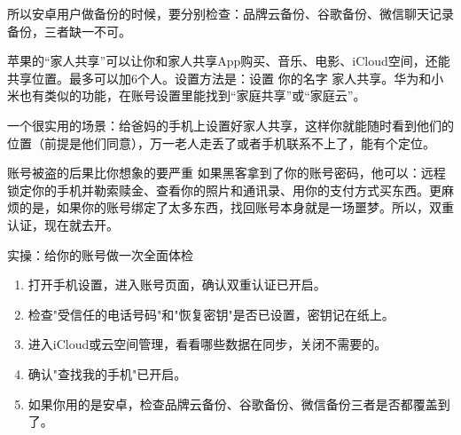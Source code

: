 所以安卓用户做备份的时候，要分别检查：品牌云备份、谷歌备份、微信聊天记录备份，三者缺一不可。


苹果的“家人共享”可以让你和家人共享App购买、音乐、电影、iCloud空间，还能共享位置。最多可以加6个人。设置方法是：设置 你的名字 家人共享。华为和小米也有类似的功能，在账号设置里能找到“家庭共享”或“家庭云”。

一个很实用的场景：给爸妈的手机上设置好家人共享，这样你就能随时看到他们的位置（前提是他们同意），万一老人走丢了或者手机联系不上了，能有个定位。

\begin{tcbwarn}{账号被盗的后果比你想象的要严重}
如果黑客拿到了你的账号密码，他可以：远程锁定你的手机并勒索赎金、查看你的照片和通讯录、用你的支付方式买东西。更麻烦的是，如果你的账号绑定了太多东西，找回账号本身就是一场噩梦。所以，双重认证，现在就去开。

\end{tcbwarn}

\begin{tcbpractice}{实操：给你的账号做一次全面体检}
\begin{enumerate}
  \item 打开手机设置，进入账号页面，确认双重认证已开启。
  \item 检查"受信任的电话号码"和"恢复密钥"是否已设置，密钥记在纸上。
  \item 进入iCloud或云空间管理，看看哪些数据在同步，关闭不需要的。
  \item 确认"查找我的手机"已开启。
  \item 如果你用的是安卓，检查品牌云备份、谷歌备份、微信备份三者是否都覆盖到了。
\end{enumerate}

\end{tcbpractice}
